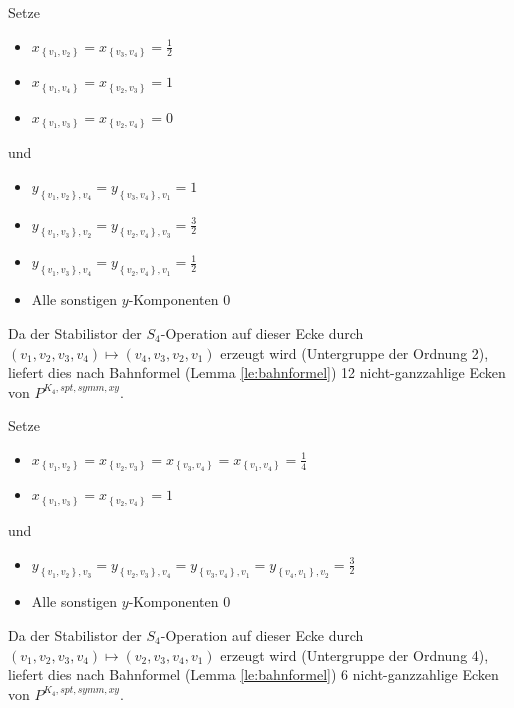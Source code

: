 \documentclass[10p,a4paper,BCOR = 12mm, DIV=15]{scrbook}
\begin{document}
\begin{Bem}
Setze
\begin{itemize}
\item $x_{\left\{v_1, v_2\right\}} = x_{\left\{v_3, v_4\right\}} = \frac{1}{2}$
\item $x_{\left\{v_1, v_4\right\}} = x_{\left\{v_2, v_3\right\}} = 1$
\item $x_{\left\{v_1, v_3\right\}} = x_{\left\{v_2, v_4\right\}} = 0$
\end{itemize}
und
\begin{itemize}
\item $y_{\left\{v_1, v_2\right\}, v_4} = y_{\left\{v_3, v_4\right\}, v_1} = 1$
\item $y_{\left\{v_1, v_3\right\}, v_2} = y_{\left\{v_2, v_4\right\}, v_3} = \frac{3}{2}$
\item $y_{\left\{v_1, v_3\right\}, v_4} = y_{\left\{v_2, v_4\right\}, v_1} = \frac{1}{2}$
\item Alle sonstigen $y$-Komponenten $0$
\end{itemize}

Da der Stabilistor der $S_4$-Operation auf dieser Ecke durch $\left(v_1, v_2, v_3, v_4\right) \mapsto \left(v_4, v_3, v_2, v_1\right)$ erzeugt wird (Untergruppe der Ordnung 2), liefert dies nach Bahnformel (Lemma \ref{le:bahnformel}) 12 nicht-ganzzahlige Ecken von $P^{K_4, spt, symm, xy}$.
\end{Bem}

\begin{Bem}
Setze
\begin{itemize}
\item $x_{\left\{v_1, v_2\right\}} = x_{\left\{v_2, v_3\right\}} = x_{\left\{v_3, v_4\right\}} = x_{\left\{v_1, v_4\right\}} = \frac{1}{4}$
\item $x_{\left\{v_1, v_3\right\}} = x_{\left\{v_2, v_4\right\}} = 1$
\end{itemize}
und
\begin{itemize}
\item  $y_{\left\{v_1, v_2\right\}, v_3} = y_{\left\{v_2, v_3\right\}, v_4} = y_{\left\{v_3, v_4\right\}, v_1} = y_{\left\{v_4, v_1\right\}, v_2} = \frac{3}{2}$
\item Alle sonstigen $y$-Komponenten $0$
\end{itemize}

Da der Stabilistor der $S_4$-Operation auf dieser Ecke durch $\left(v_1, v_2, v_3, v_4\right) \mapsto \left(v_2, v_3, v_4, v_1\right)$ erzeugt wird (Untergruppe der Ordnung 4), liefert dies nach Bahnformel (Lemma \ref{le:bahnformel}) 6 nicht-ganzzahlige Ecken von $P^{K_4, spt, symm, xy}$.
\end{Bem}
\end{document}
